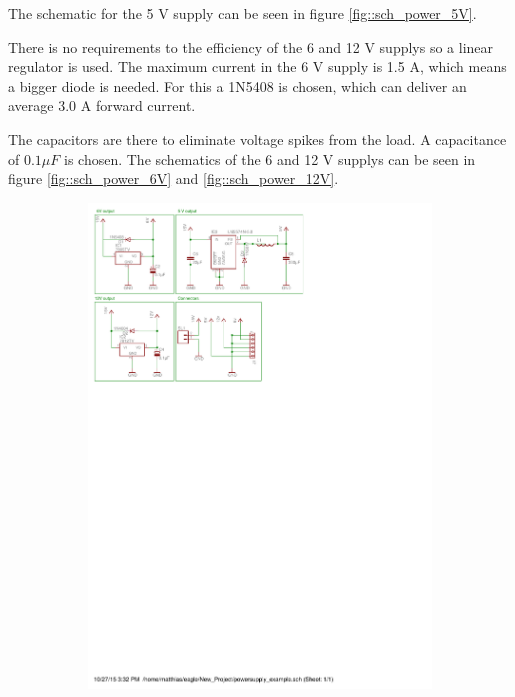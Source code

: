 The schematic for the 5 V supply can be seen in figure \ref{fig::sch_power_5V}.

There is no requirements to the efficiency of the 6 and 12 V supplys so a linear regulator is used.
The maximum current in the 6 V supply is 1.5 A, which means a bigger diode is needed.
For this a 1N5408 is chosen, which can deliver an average 3.0 A forward current\cite[p. 1]{ds:1N5408}.

The capacitors are there to eliminate voltage spikes from the load. A capacitance of $0.1 \mu F$ is chosen\cite[p. 702]{book:prac_ele}.
The schematics of the 6 and 12 V supplys can be seen in figure \ref{fig::sch_power_6V} and \ref{fig::sch_power_12V}.

\begin{figure}[H] %
\centering
\begin{subfigure}{0.3\linewidth}
\centering
\includegraphics[scale=0.8,trim={0 24cm 15.7cm 0.6cm},clip]{img/powersupply.pdf}

\end{subfigure}
\end{figure}
